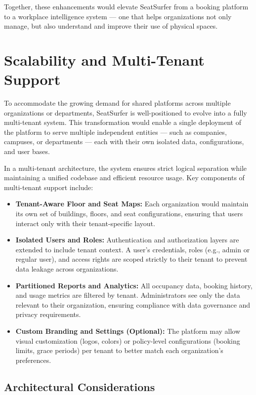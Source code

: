 \documentclass[12pt,a4paper]{report} %
\begin{document}
Together, these enhancements would elevate SeatSurfer from a booking platform to a workplace intelligence system — one that helps organizations not only manage, but also understand and improve their use of physical spaces.

\section{Scalability and Multi-Tenant Support}

To accommodate the growing demand for shared platforms across multiple organizations or departments, SeatSurfer is well-positioned to evolve into a fully multi-tenant system. This transformation would enable a single deployment of the platform to serve multiple independent entities — such as companies, campuses, or departments — each with their own isolated data, configurations, and user bases.

In a multi-tenant architecture, the system ensures strict logical separation while maintaining a unified codebase and efficient resource usage. Key components of multi-tenant support include:

\begin{itemize}
\item \textbf{Tenant-Aware Floor and Seat Maps:}
Each organization would maintain its own set of buildings, floors, and seat configurations, ensuring that users interact only with their tenant-specific layout.
\item \textbf{Isolated Users and Roles:}  
Authentication and authorization layers are extended to include tenant context. A user's credentials, roles (e.g., admin or regular user), and access rights are scoped strictly to their tenant to prevent data leakage across organizations.
\item \textbf{Partitioned Reports and Analytics:}  
All occupancy data, booking history, and usage metrics are filtered by tenant. Administrators see only the data relevant to their organization, ensuring compliance with data governance and privacy requirements.
\item \textbf{Custom Branding and Settings (Optional):}  
The platform may allow visual customization (logos, colors) or policy-level configurations (booking limits, grace periods) per tenant to better match each organization's preferences.
\end{itemize}

\subsection*{Architectural Considerations}
\end{document}
